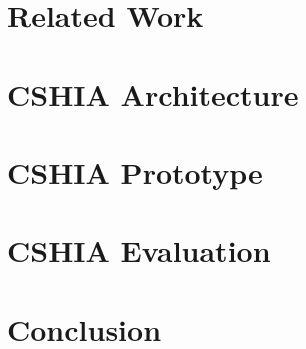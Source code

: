 \documentclass[Ingles,Final]{ic-tese-v3}
\begin{document}
\chapter{Related Work}
\label{chap:related_work}


\chapter{CSHIA  Architecture}
\label{chap:cshia_architecture}


\chapter{CSHIA  Prototype}
\label{chap:cshia_prototype}


\chapter{CSHIA  Evaluation}
\label{chap:cshia:evaluation}


\chapter{Conclusion}
\label{chap:conclusion}
 





\appendix

%     
% 
\end{document}
